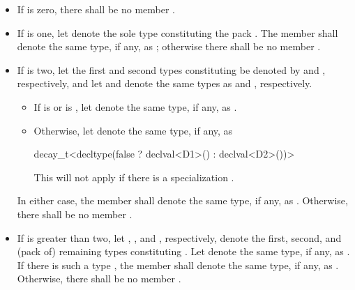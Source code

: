 \begin{itemize}
\item If  is zero, there shall be no member .

\item If  is one, let  denote the sole type
constituting the pack .
The member   shall denote the same
type, if any, as ;
otherwise there shall be no member .

\item If  is two,
let the first and second types constituting  be denoted
by  and , respectively, and
let  and  denote
the same types as  and , respectively.
  \begin{itemize}
  \item If  is  or
      is ,
     let  denote the same type, if any, as .
  \item Otherwise, let  denote the same type, if any, as
\begin{codeblock}
decay_t<decltype(false ? declval<D1>() : declval<D2>())>
\end{codeblock}
     \begin{note}
     This will not apply if there is a specialization .
     \end{note}
  \end{itemize}
In either case, the member   shall denote
the same type, if any, as .
Otherwise, there shall be no member .

\item If  is greater than two,
let , , and , respectively,
denote the first, second, and (pack of) remaining types constituting .
Let  denote the same type, if any, as .
If there is such a type , the member  
shall denote the same type, if any, as .
Otherwise, there shall be no member .
\end{itemize}

